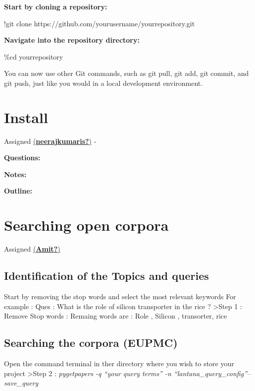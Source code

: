 \documentclass[
  letterpaper,
  DIV=11,
  numbers=noendperiod]{scrreprt}
\begin{document}
\textbf{Start by cloning a repository:}

!git clone https://github.com/yourusername/yourrepository.git

\textbf{Navigate into the repository directory:}

\%cd yourrepository

You can now use other Git commands, such as git pull, git add, git
commit, and git push, just like you would in a local development
environment.

\section{Install}\label{install}

Assigned
\href{https://github.com/neerajkumaris}{(\textbf{neerajkumaris?})} -

\textbf{Questions:}

\textbf{Notes:}

\textbf{Outline:}

\section{Searching open corpora}\label{searching-open-corpora}

Assigned \href{https://github.com/ydv-amit-ydv}{(\textbf{Amit?})}

\subsection{\texorpdfstring{\textbf{Identification of the Topics and
queries}
}{Identification of the Topics and queries  }}\label{identification-of-the-topics-and-queries}

Start by removing the stop words and select the most relevant keywords
For example : Ques : What is the role of silicon transporter in the rice
? \textgreater Step 1 : Remove Stop words : Remaing words are : Role ,
Silicon , transorter, rice

\subsection{\texorpdfstring{\textbf{Searching the corpora (EUPMC)}
}{Searching the corpora (EUPMC)  }}\label{searching-the-corpora-eupmc}

Open the command terminal in ther directory where you wish to store your
project \textgreater Step 2 : \emph{pygetpapers -q ``your query terms''
-n ``lantana\_query\_config''--save\_query}
\end{document}
